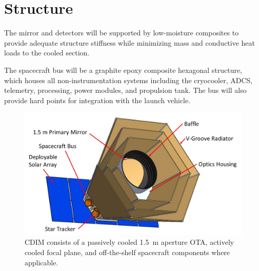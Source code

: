 \documentclass{ws-jai}
\begin{document}
\section{Structure}
\label{sec:structure}
The mirror and detectors will be supported by low-moisture composites to provide adequate structure stiffness while minimizing mass and conductive heat loads to the cooled section.

The spacecraft bus will be a graphite epoxy composite hexagonal structure, which houses all non-instrumentation systems including the cryocooler, ADCS, telemetry, processing, power modules, and propulsion tank.
The bus will also provide hard points for integration with the launch vehicle.


\begin{figure}[htp]
  \includegraphics[width=.8\linewidth]{figs/cdim_annotated-cartoon}
  \caption{CDIM consists of a passively cooled \SI{1.5}{\meter} aperture OTA, actively cooled focal plane, and off-the-shelf spacecraft components where applicable.}
\label{fig:cdim-annotated}
\end{figure}
\end{document}
